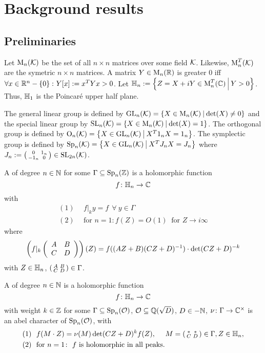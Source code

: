 
\section{Background results}

\subsection{Preliminaries}

Let $\operatorname{M}_n(\mathcal{K})$ be the set of all $n \times n$ matrices over some field $\mathcal{K}$.
Likewise, $\operatorname{M}_n^T(\mathcal{K})$ are the symetric $n \times n$ matrices.
A matrix $Y \in \operatorname{M}_n(\mathbb{R})$ is greater $0$ iff $\forall x \in \R^n - \Set{0} \colon Y[x] := x^T Y x > 0$.
Let $\HalfPlane_n := \Set{Z = X + iY \in \M_n^T(\C)}{Y > 0}$.
Thus, $\mathbb{H}_1$ is the Poincaré upper half plane.

The general linear group is defined by $\GL_n(\K) = \Set{X \in \M_n(\K)}{\det(X) \neq 0}$
and the special linear group by $\SL_n(\K) = \Set{X \in \M_n(\K)}{\det(X) = 1}$. %
The orthogonal group is defined by $\Orth_n(\K) = \Set{X \in \GL_n(\K)}{X^T 1_n X = 1_n}$. %
The symplectic group is defined by $\Sp_n(\K) = \Set{X \in \GL_n(\K)}{X^T J_n X = J_n}$ %
where $J_n := \left( \begin{smallmatrix} 0 & 1_n \\ -1_n & 0 \end{smallmatrix} \right) \in \operatorname{SL}_{2n}(\mathcal{K})$. %

A  of degree $n\in\mathbb{N}$ for some $\Gamma \subseteq \operatorname{Sp}_n(\mathbb{Z})$ is a holomorphic function
\[ f \colon \mathbb{H}_n \rightarrow \mathbb{C} \]
with
\begin{align*}
(1) \ \ & f |_k y = f \ \ \forall \ y \in \Gamma \\
(2) \ \ & \text{for } n = 1 \colon f(Z) = O(1) \ \text{ for } Z \rightarrow i \infty
\end{align*}
where
\[ \left( f|_k \left( \begin{array}{cc} A & B \\ C & D \end{array} \right) \right) (Z) =
f((AZ + B)(CZ + D)^{-1}) \cdot \det(CZ + D)^{-k} \]
with $Z \in \mathbb{H}_n$, $\left( \begin{smallmatrix} A & B \\ C & D \end{smallmatrix} \right) \in \Gamma$.

A  of degree $n\in\mathbb{N}$
is a holomorphic function
\[ f \colon \mathbb{H}_n \rightarrow \mathbb{C} \]
with weight $k\in \mathbb{Z}$ for some $\Gamma \subseteq \operatorname{Sp}_n(\mathcal{O})$, $\mathcal{O} \subseteq \mathbb{Q}(\sqrt{D})$, $D \in -\mathbb{N}$, $\nu \colon \Gamma \rightarrow \mathbb{C}^\times$ is an abel character of $\operatorname{Sp}_n(\mathcal{O})$, with
\begin{align*}
(1) \ \ & f(M \cdot Z) = \nu(M) \det(CZ + D)^k f(Z), \ \ \ \ M = \left( \begin{smallmatrix} * & * \\ C & D \end{smallmatrix} \right) \in \Gamma, Z \in \mathbb{H}_n , \\
(2) \ \ & \text{for } n = 1 \colon \ \text{$f$ is holomorphic in all peaks} .
\end{align*}

